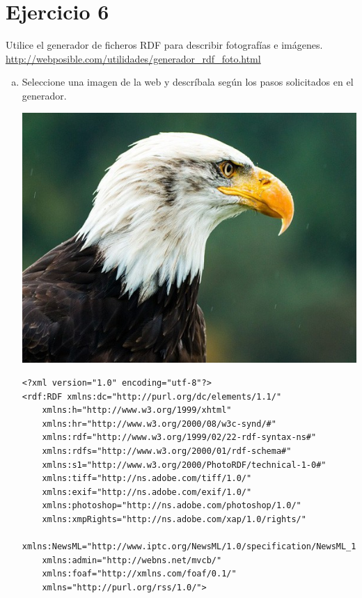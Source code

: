 \documentclass[a4paper,12pt,twoside,final,spanish]{article}
\begin{document}
\section*{Ejercicio 6}

Utilice el generador de ficheros RDF para describir fotografías e imágenes.\\
\url{http://webposible.com/utilidades/generador_rdf_foto.html}

\begin{enumerate}[a.]
\item Seleccione una imagen de la web y descríbala según los pasos solicitados en el generador. 

\dotfill

\begin{center}
\includegraphics[width=0.9\linewidth,keepaspectratio]{6.jpg}
\end{center}

\begin{lstlisting}
<?xml version="1.0" encoding="utf-8"?>
<rdf:RDF xmlns:dc="http://purl.org/dc/elements/1.1/"
	xmlns:h="http://www.w3.org/1999/xhtml"
	xmlns:hr="http://www.w3.org/2000/08/w3c-synd/#"
	xmlns:rdf="http://www.w3.org/1999/02/22-rdf-syntax-ns#"
	xmlns:rdfs="http://www.w3.org/2000/01/rdf-schema#"
	xmlns:s1="http://www.w3.org/2000/PhotoRDF/technical-1-0#"
	xmlns:tiff="http://ns.adobe.com/tiff/1.0/"
	xmlns:exif="http://ns.adobe.com/exif/1.0/"
	xmlns:photoshop="http://ns.adobe.com/photoshop/1.0/"
	xmlns:xmpRights="http://ns.adobe.com/xap/1.0/rights/"
	xmlns:NewsML="http://www.iptc.org/NewsML/1.0/specification/NewsML_1.0.dtd"
	xmlns:admin="http://webns.net/mvcb/"
	xmlns:foaf="http://xmlns.com/foaf/0.1/"
	xmlns="http://purl.org/rss/1.0/">


\end{lstlisting}
\end{enumerate}
\end{document}
